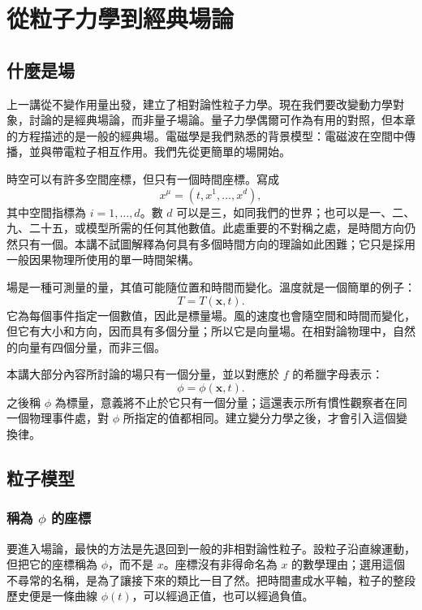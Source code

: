 \chapter{從粒子力學到經典場論}

\section{什麼是場}

上一講從不變作用量出發，建立了相對論性粒子力學。現在我們要改變動力學對象，討論的是經典場論，而非量子場論。量子力學偶爾可作為有用的對照，但本章的方程描述的是一般的經典場。電磁學是我們熟悉的背景模型：電磁波在空間中傳播，並與帶電粒子相互作用。我們先從更簡單的場開始。

時空可以有許多空間座標，但只有一個時間座標。寫成
\begin{equation}
x^\mu=(t,x^1,\ldots,x^d),
\end{equation}
其中空間指標為 \(i=1,\ldots,d\)。數 \(d\) 可以是三，如同我們的世界；也可以是一、二、九、二十五，或模型所需的任何其他數值。此處重要的不對稱之處，是時間方向仍然只有一個。本講不試圖解釋為何具有多個時間方向的理論如此困難；它只是採用一般因果物理所使用的單一時間架構。

場是一種可測量的量，其值可能隨位置和時間而變化。溫度就是一個簡單的例子：
\begin{equation}
T=T(\mathbf{x},t).
\end{equation}
它為每個事件指定一個數值，因此是標量場。風的速度也會隨空間和時間而變化，但它有大小和方向，因而具有多個分量；所以它是向量場。在相對論物理中，自然的向量有四個分量，而非三個。

本講大部分內容所討論的場只有一個分量，並以對應於 \(f\) 的希臘字母表示：
\begin{equation}
\phi=\phi(\mathbf{x},t).
\label{eq:sr4-field-definition}
\end{equation}
之後稱 \(\phi\) 為標量，意義將不止於它只有一個分量；這還表示所有慣性觀察者在同一個物理事件處，對 \(\phi\) 所指定的值都相同。建立變分力學之後，才會引入這個變換律。

\section{粒子模型}

\subsection{稱為 \texorpdfstring{\(\phi\)}{phi} 的座標}

要進入場論，最快的方法是先退回到一般的非相對論性粒子。設粒子沿直線運動，但把它的座標稱為 \(\phi\)，而不是 \(x\)。座標沒有非得命名為 \(x\) 的數學理由；選用這個不尋常的名稱，是為了讓接下來的類比一目了然。把時間畫成水平軸，粒子的整段歷史便是一條曲線 \(\phi(t)\)，可以經過正值，也可以經過負值。


